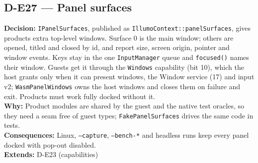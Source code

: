 \subsection*{D-E27 --- Panel surfaces}
\begin{decisionbox}[title={D-E27 \quad 2026-09-23}]
\textbf{Decision:} \texttt{IPanelSurfaces}, published as
\texttt{IllumoContext::panelSurfaces}, gives products extra top-level windows.
Surface 0 is the main window; others are opened, titled and closed by id, and
report size, screen origin, pointer and window events. Keys stay in the one
\texttt{InputManager} queue and \texttt{focused()} names their window. Guests
get it through the \texttt{Windows} capability (bit 10), which the host grants
only when it can present windows, the Window service (17) and input v2;
\texttt{WasmPanelWindows} owns the host windows and closes them on failure and
exit. Products must work fully docked without it.\\
\textbf{Why:} Product modules are shared by the guest and the native test
oracles, so they need a seam free of guest types; \texttt{FakePanelSurfaces}
drives the same code in tests.\\
\textbf{Consequences:} Linux, \texttt{--capture}, \texttt{--bench-*} and
headless runs keep every panel docked with pop-out disabled.\\
\textbf{Extends:} D-E23 (capabilities)
\end{decisionbox}

